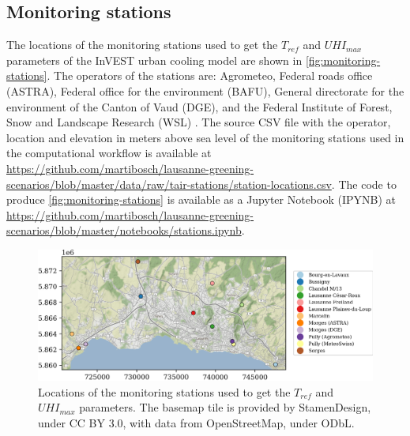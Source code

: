 \documentclass[10pt,letterpaper]{article}
\begin{document}


\subsection*{Monitoring stations}
\label{sec:monitoring-stations}

The locations of the monitoring stations used to get the $T_{ref}$ and $UHI_{max}$ parameters of the InVEST urban cooling model are shown in \autoref{fig:monitoring-stations}. The operators of the stations are: Agrometeo, Federal roads office (ASTRA), Federal office for the environment (BAFU), General directorate for the environment of the Canton of Vaud (DGE), and the Federal Institute of Forest, Snow and Landscape Research (WSL) \cite{rebetez2018meteorological}.
The source CSV file with the operator, location and elevation in meters above sea level of the monitoring stations used in the computational workflow is available at \url{https://github.com/martibosch/lausanne-greening-scenarios/blob/master/data/raw/tair-stations/station-locations.csv}.
The code to produce \autoref{fig:monitoring-stations} is available as a Jupyter Notebook (IPYNB) at \url{https://github.com/martibosch/lausanne-greening-scenarios/blob/master/notebooks/stations.ipynb}.

\begin{figure}[H]
  \centering
  \includegraphics[width=.98\textwidth]{figures/monitoring-stations}
  \caption{\label{fig:monitoring-stations} Locations of the monitoring stations used to get the $T_{ref}$ and $UHI_{max}$ parameters. The basemap tile is provided by StamenDesign, under CC BY 3.0, with data from OpenStreetMap, under ODbL.}
\end{figure}
\end{document}
